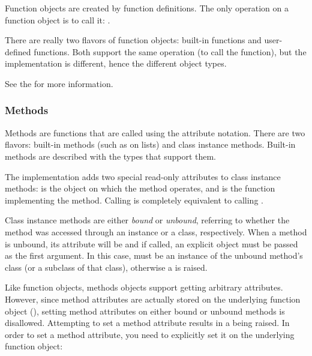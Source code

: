 Function objects are created by function definitions.  The only
operation on a function object is to call it:
.

There are really two flavors of function objects: built-in functions
and user-defined functions.  Both support the same operation (to call
the function), but the implementation is different, hence the
different object types.

See the  for more
information.

\subsubsection{Methods \label{typesmethods}}

Methods are functions that are called using the attribute notation.
There are two flavors: built-in methods (such as  on
lists) and class instance methods.  Built-in methods are described
with the types that support them.

The implementation adds two special read-only attributes to class
instance methods:  is the object on which the
method operates, and  is the function
implementing the method.  Calling  is completely equivalent to
calling .

Class instance methods are either \emph{bound} or \emph{unbound},
referring to whether the method was accessed through an instance or a
class, respectively.  When a method is unbound, its 
attribute will be  and if called, an explicit 
object must be passed as the first argument.  In this case,
 must be an instance of the unbound method's class (or a
subclass of that class), otherwise a  is raised.

Like function objects, methods objects support getting
arbitrary attributes.  However, since method attributes are actually
stored on the underlying function object (),
setting method attributes on either bound or unbound methods is
disallowed.  Attempting to set a method attribute results in a
 being raised.  In order to set a method attribute,
you need to explicitly set it on the underlying function object:

